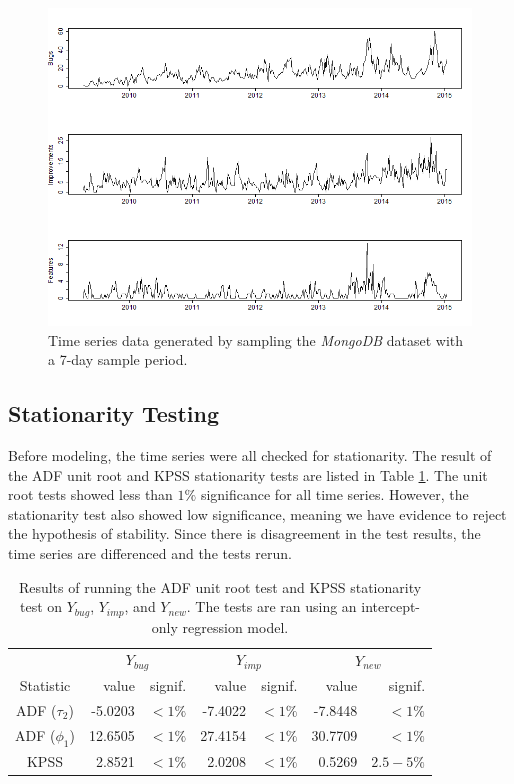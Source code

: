 \documentclass[a4paper]{scrartcl}
\begin{document}
\begin{figure}[htbp!]
\begin{center}
\includegraphics[width=\textwidth]{assets/time_series}
\caption{Time series data generated by sampling the \textit{MongoDB} dataset with a 7-day sample period.}
\label{fig:time_series}
\end{center}
\end{figure}

\subsection*{Stationarity Testing}

Before modeling, the time series were all checked for stationarity. The result of the ADF unit root and KPSS stationarity tests are listed in Table \ref{tab:stationarity_results}. The unit root tests showed less than $1\%$ significance for all time series. However, the stationarity test also showed low significance, meaning we have evidence to reject the hypothesis of stability. Since there is disagreement in the test results, the time series are differenced and the tests rerun.

\begin{table}[h!]
  \centering
  \begin{tabular}{ c | r r | r r | r r }
      & \multicolumn{2}{|c|}{$Y_{bug}$} & \multicolumn{2}{|c|}{$Y_{imp}$} & \multicolumn{2}{|c}{$Y_{new}$} \\
    Statistic & value & signif. & value & signif. & value & signif. \\
    \hline
    ADF ($\tau_2$) & -5.0203 & $< 1\%$ & -7.4022 & $< 1\%$ & -7.8448 & $< 1\%$ \\
    ADF ($\phi_1$) & 12.6505 & $< 1\%$ & 27.4154 & $< 1\%$ & 30.7709 & $< 1\%$ \\
    KPSS & 2.8521 & $< 1\%$ & 2.0208 & $< 1\%$ & 0.5269 & $2.5-5\%$ \\
    \hline
  \end{tabular}
\caption{Results of running the ADF unit root test and KPSS stationarity test on $Y_{bug}$, $Y_{imp}$, and $Y_{new}$. The tests are ran using an intercept-only regression model.}
\label{tab:stationarity_results}
\end{table}
\end{document}
